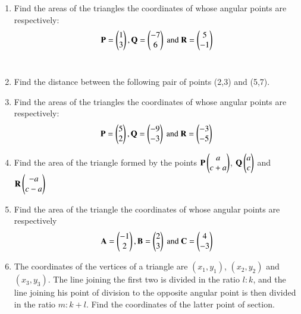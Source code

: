 \renewcommand{\theequation}{\theenumi}
\renewcommand{\thefigure}{\theenumi}
\begin{enumerate}[label=\thesubsection.\arabic*.,ref=\thesubsection.\theenumi]
\item     Find the areas of the triangles the coordinates of
    whose angular points are respectively: 
%
\begin{align}
\Vec{P} =\myvec{1 \\3 }, \Vec{Q} =\myvec{- 7\\ 6 }\text{ and } \Vec{R} =\myvec{5 \\-1 }
\end{align}	
\\
\solution


\item Find the distance between the following pair of points (2,3) and (5,7). 
\\
\solution
%

\item Find the areas of the triangles the coordinates of
    whose angular points are respectively: 
\begin{equation}
\Vec{P} =\myvec{5 \\2 }, \Vec{Q} =\myvec{- 9\\ -3 }\text{ and } \Vec{R} =\myvec{-3 \\-5}\\
\end{equation}
%
\solution

\item Find the area of the triangle formed by the points $ \mathbf{P} \begin{pmatrix}a\\c+a\end{pmatrix}$, $\mathbf{Q} \begin{pmatrix}a\\c\end{pmatrix}$ and $\mathbf{R} \begin{pmatrix}-a\\c-a\end{pmatrix}$
\\
\solution

%
\item Find the area of the triangle the coordinates of whose angular points are respectively
%
\begin{align}
    \Vec{A} =\myvec{-1 \\2 }, \Vec{B} =\myvec{2\\ 3 }\text{ and } \Vec{C} =\myvec{4 \\-3 }
    \end{align}
    \solution
    
        
\item The coordinates of the vertices of a triangle are $(x_1,y_1)$, $(x_2,y_2)$ and $(x_3,y_3)$. The line joining the first two is divided in the ratio $l:k$, and the line joining his point of division to the opposite angular point is then divided in the ratio  $m:k+l$. Find the coordinates of the latter point of section. 
%
\\
\solution


\end{enumerate}
